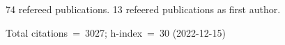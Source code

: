 74 refereed publications. 13 refeered publications as first author.

Total citations~=~3027; h-index~=~30 (2022-12-15)